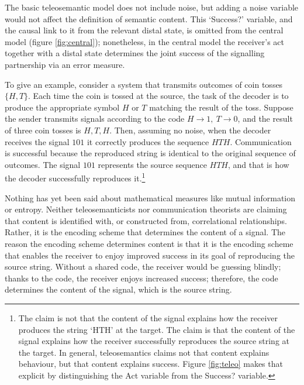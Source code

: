 \documentclass[12pt]{article}
\begin{document}
The basic teleosemantic model does not include noise, but adding a noise variable would not affect the definition of semantic content.
This `Success?' variable, and the causal link to it from the relevant distal state, is omitted from the central model (figure \ref{fig:central}); nonetheless, in the central model the receiver's act together with a distal state determines the joint success of the signalling partnership via an error measure.

% 

To give an example, consider a system that transmits outcomes of coin tosses $\{H,T\}$.
Each time the coin is tossed at the source, the task of the decoder is to produce the appropriate symbol $H$ or $T$ matching the result of the toss.
Suppose the sender transmits signals according to the code $H\rightarrow1,\ T\rightarrow0$, and the result of three coin tosses is $H, T, H$.
Then, assuming no noise, when the decoder receives the signal $101$ it correctly produces the sequence $HTH$.
Communication is successful because the reproduced string is identical to the original sequence of outcomes.
The signal $101$ represents the source sequence $HTH$, and that is how the decoder successfully reproduces it.\footnote{The claim is not that the content of the signal explains how the receiver produces the string `HTH' at the target. The claim is that the content of the signal explains how the receiver successfully reproduces the source string at the target. In general, teleosemantics claims not that content explains behaviour, but that content explains success. Figure \ref{fig:teleo} makes that explicit by distinguishing the Act variable from the Success? variable.}

Nothing has yet been said about mathematical measures like mutual information or entropy.
Neither teleosemanticists nor communication theorists are claiming that content is identified with, or constructed from, correlational relationships.
Rather, it is the encoding scheme that determines the content of a signal.
The reason the encoding scheme determines content is that it is the encoding scheme that enables the receiver to enjoy improved success in its goal of reproducing the source string.
Without a shared code, the receiver would be guessing blindly; thanks to the code, the receiver enjoys increased success; therefore, the code determines the content of the signal, which is the source string.
\end{document}
